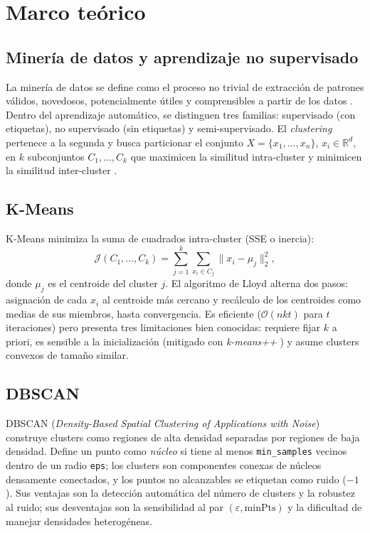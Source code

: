 \section{Marco teórico}

\subsection{Minería de datos y aprendizaje no supervisado}

La minería de datos se define como el proceso no trivial de extracción de patrones válidos, novedosos, potencialmente útiles y comprensibles a partir de los datos \citep{fayyad1996kdd}. Dentro del aprendizaje automático, se distinguen tres familias: supervisado (con etiquetas), no supervisado (sin etiquetas) y semi-supervisado. El \emph{clustering} pertenece a la segunda y busca particionar el conjunto $X = \{x_1, \dots, x_n\}$, $x_i \in \mathbb{R}^d$, en $k$ subconjuntos $C_1, \dots, C_k$ que maximicen la similitud intra-cluster y minimicen la similitud inter-cluster \citep{jain1999data,jain2010clustering}.

\subsection{K-Means}

K-Means \citep{macqueen1967some,lloyd1982least} minimiza la suma de cuadrados intra-cluster (SSE o inercia):
\begin{equation}
\mathcal{J}(C_1,\dots,C_k) = \sum_{j=1}^{k} \sum_{x_i \in C_j} \|x_i - \mu_j\|_2^2,
\label{eq:kmeans}
\end{equation}
donde $\mu_j$ es el centroide del cluster $j$. El algoritmo de Lloyd alterna dos pasos: asignación de cada $x_i$ al centroide más cercano y recálculo de los centroides como medias de sus miembros, hasta convergencia. Es eficiente ($\mathcal{O}(nkt)$ para $t$ iteraciones) pero presenta tres limitaciones bien conocidas: requiere fijar $k$ a priori, es sensible a la inicialización (mitigado con \emph{k-means++} \citep{arthur2007kmeanspp}) y asume clusters convexos de tamaño similar.

\subsection{DBSCAN}

DBSCAN (\emph{Density-Based Spatial Clustering of Applications with Noise}) \citep{ester1996density} construye clusters como regiones de alta densidad separadas por regiones de baja densidad. Define un punto como \emph{núcleo} si tiene al menos \texttt{min\_samples} vecinos dentro de un radio \texttt{eps}; los clusters son componentes conexas de núcleos densamente conectados, y los puntos no alcanzables se etiquetan como ruido ($-1$). Sus ventajas son la detección automática del número de clusters y la robustez al ruido; sus desventajas son la sensibilidad al par $(\varepsilon, \text{minPts})$ y la dificultad de manejar densidades heterogéneas.

